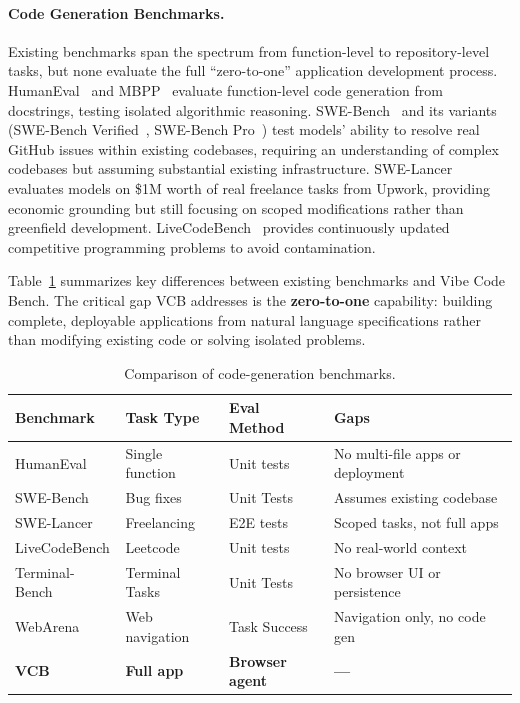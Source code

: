 \paragraph{Code Generation Benchmarks.}
Existing benchmarks span the spectrum from function-level to repository-level tasks, but none evaluate the full ``zero-to-one'' application development process. HumanEval~\cite{chen2021codex} and MBPP~\cite{austin2021program} evaluate function-level code generation from docstrings, testing isolated algorithmic reasoning. SWE-Bench~\cite{jimenez2024swebench} and its variants (SWE-Bench Verified~\cite{chowdhury2024swebenchverified}, SWE-Bench Pro~\cite{swebenchpro2025}) test models' ability to resolve real GitHub issues within existing codebases, requiring an understanding of complex codebases but assuming substantial existing infrastructure. SWE-Lancer~\cite{miserendino2025swelancer} evaluates models on \$1M worth of real freelance tasks from Upwork, providing economic grounding but still focusing on scoped modifications rather than greenfield development. LiveCodeBench~\cite{jain2024livecodebench} provides continuously updated competitive programming problems to avoid contamination.

Table~\ref{tab:benchmark_comparison} summarizes key differences between existing benchmarks and Vibe Code Bench. The critical gap VCB addresses is the \textbf{zero-to-one} capability: building complete, deployable applications from natural language specifications rather than modifying existing code or solving isolated problems.

\begin{table}[t]
\caption{Comparison of code-generation benchmarks.}
\label{tab:benchmark_comparison}
\small
\setlength{\tabcolsep}{4pt}
\begin{tabular}{@{}p{2.0cm}p{1.5cm}p{1.7cm}p{2.5cm}@{}}
\toprule
\textbf{Benchmark} & \textbf{Task Type} & \textbf{Eval Method} & \textbf{Gaps} \\
\midrule
HumanEval & Single function & Unit tests & No multi-file apps or deployment \\
SWE-Bench & Bug fixes & Unit Tests & Assumes existing codebase \\
SWE-Lancer & Freelancing & E2E tests & Scoped tasks, not full apps \\
LiveCodeBench & Leetcode & Unit tests & No real-world context \\
Terminal-Bench & Terminal Tasks & Unit Tests & No browser UI or persistence \\
WebArena & Web navigation & Task Success & Navigation only, no code gen \\
\midrule
\textbf{VCB} & \textbf{Full app} & \textbf{Browser agent} & \textbf{---} \\
\bottomrule
\end{tabular}
\end{table}

